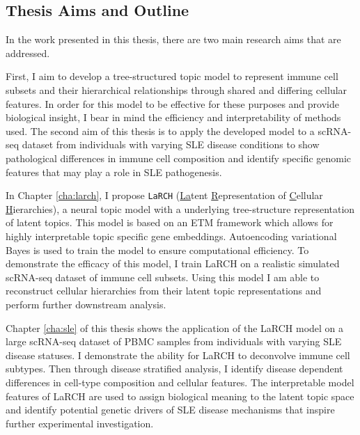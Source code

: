 \subsection{Thesis Aims and Outline}

In the work presented in this thesis, there are two main research aims that are addressed. 

First, I aim to develop a tree-structured topic model to represent immune cell subsets and their hierarchical relationships through shared and differing cellular features. In order for this model to be effective for these purposes and provide biological insight, I bear in mind the efficiency and interpretability of methods used. The second aim of this thesis is to apply the developed model to a scRNA-seq dataset from individuals with varying SLE disease conditions to show pathological differences in immune cell composition and identify specific genomic features that may play a role in SLE pathogenesis.

In Chapter \ref{cha:larch}, I propose \texttt{LaRCH} (\underline{La}tent \underline{R}epresentation of \underline{C}ellular \underline{H}ierarchies), a neural topic model with a underlying tree-structure representation of latent topics. This model is based on an ETM framework which allows for highly interpretable topic specific gene embeddings. Autoencoding variational Bayes is used to train the model to ensure computational efficiency. To demonstrate the efficacy of this model, I train LaRCH on a realistic simulated scRNA-seq dataset of immune cell subsets. Using this model I am able to reconstruct cellular hierarchies from their latent topic representations and perform further downstream analysis.

Chapter \ref{cha:sle} of this thesis shows the application of the LaRCH model on a large scRNA-seq dataset of PBMC samples from individuals with varying SLE disease statuses. I demonstrate the ability for LaRCH to deconvolve immune cell subtypes. Then through disease stratified analysis, I identify disease dependent differences in cell-type composition and cellular features. The interpretable model features of LaRCH are used to assign biological meaning to the latent topic space and identify potential genetic drivers of SLE disease mechanisms that inspire further experimental investigation.
